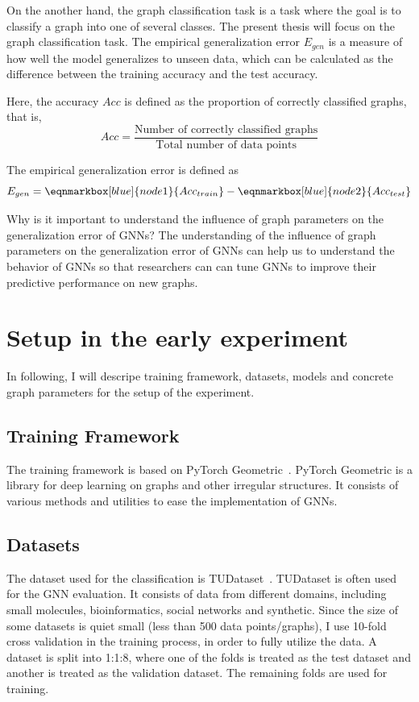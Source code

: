 \documentclass{article}
\begin{document}
On the another hand, the graph classification task is a task where the goal is to classify a graph into one of several classes. The present thesis will focus on the graph classification task. The empirical generalization error $E_{gen}$ is a measure of how well the model generalizes to unseen data, which can be calculated as the difference between the training accuracy and the test accuracy.

Here, the accuracy $Acc$ is defined as the proportion of correctly classified graphs, that is, 
$$Acc = \frac{\text{Number of correctly classified graphs}}{\text{Total number of data points}}$$

The empirical generalization error is defined as
\\

\begin{equation*}
    E_{gen} = \eqnmarkbox[blue]{node1}{Acc_{train}} - \eqnmarkbox[blue]{node2}{Acc_{test}}
\end{equation*}

Why is it important to understand the influence of graph parameters on the generalization error of GNNs? The understanding of the influence of graph parameters on the generalization error of GNNs can help us to understand the behavior of GNNs so that researchers can can tune GNNs to improve their predictive performance on new graphs.
\section{Setup in the early experiment}
In following, I will descripe training framework, datasets, models and concrete graph parameters for the setup of the experiment.

\subsection{Training Framework}
The training framework is based on PyTorch Geometric~\cite{fey2019fast}. PyTorch Geometric is a library for deep learning on graphs and other irregular structures. It consists of various methods and utilities to ease the implementation of GNNs. 

\subsection{Datasets}
The dataset used for the classification is TUDataset~\cite{morris2020tudataset}. TUDataset is often used for the GNN evaluation. It consists of data from different domains, including small molecules, bioinformatics, social networks and synthetic. Since the size of some datasets is quiet small (less than 500 data points/graphs), I use 10-fold cross validation in the training process, in order to fully utilize the data. A dataset is split into 1:1:8, where one of the folds is treated as the test dataset and another is treated as the validation dataset. The remaining folds are used for training. 
\end{document}
